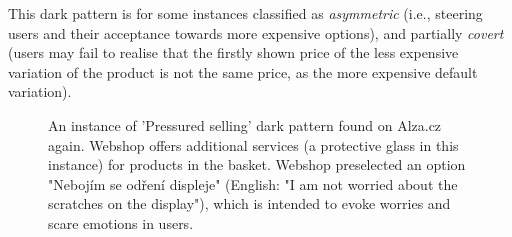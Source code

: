         This dark pattern is for some instances classified as \emph{asymmetric} (i.e., steering users and their acceptance towards more expensive options), and partially \emph{covert} (users may fail to realise that the firstly shown price of the less expensive variation of the product is not the same price, as the more expensive default variation).

        \begin{figure}[ht]
            \RawFloats
            \centering
            \begin{minipage}[ht]{0.55\linewidth}
                \strut\vspace*{-\baselineskip}\newline
                \centering
                \caption{An instance of 'Pressured selling' dark pattern found on Alza.cz again. Webshop offers additional services (a protective glass in this instance) for products in the basket. Webshop preselected an option "Nebojím se odření displeje" (English: "I am not worried about the scratches on the display"), which is intended to evoke worries and scare emotions in users.}
                \label{fig:pressured-selling-alza1}
            \end{minipage}
            \hfill
            \begin{minipage}[ht]{0.40\linewidth}
                \strut\vspace*{-\baselineskip}\newline
                \centering

\end{minipage}
\end{figure}

